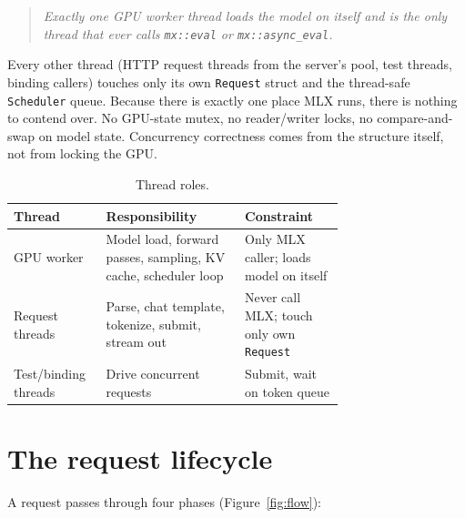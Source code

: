 \documentclass[11pt,a4paper]{report}
\newcommand{\code}[1]{\texttt{#1}}
\begin{document}
\begin{quote}
\emph{Exactly one GPU worker thread loads the model on itself and is the only
thread that ever calls \code{mx::eval} or \code{mx::async\_eval}.}
\end{quote}

Every other thread (HTTP request threads from the server's pool, test threads,
binding callers) touches only its own \code{Request} struct and the thread-safe
\code{Scheduler} queue. Because there is exactly one place MLX runs, there is
nothing to contend over. No GPU-state mutex, no reader/writer locks, no
compare-and-swap on model state. Concurrency correctness comes from the structure
itself, not from locking the GPU.

\begin{table}[h]
\centering
\caption{Thread roles.}
\label{tab:threads}
\small
\begin{tabular}{@{}l p{0.42\linewidth} p{0.30\linewidth}@{}}
\toprule
Thread & Responsibility & Constraint \\
\midrule
GPU worker        & Model load, forward passes, sampling, KV cache, scheduler loop
                  & Only MLX caller; loads model on itself \\
Request threads   & Parse, chat template, tokenize, submit, stream out
                  & Never call MLX; touch only own \code{Request} \\
Test/binding threads & Drive concurrent requests
                  & Submit, wait on token queue \\
\bottomrule
\end{tabular}
\end{table}

\section{The request lifecycle}
A request passes through four phases (Figure~\ref{fig:flow}):
\end{document}

